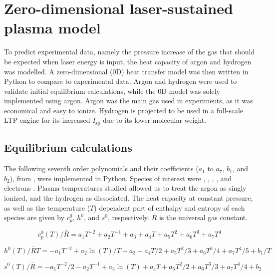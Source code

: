 \chapter{Zero-dimensional laser-sustained plasma model} \label{chp:models}

    To predict experimental data, namely the pressure increase of the gas that should be expected when laser energy is input, the heat capacity of argon and hydrogen was modelled. A zero-dimensional (0D) heat transfer model was then written in Python to compare to experimental data. Argon and hydrogen were used to validate initial equilibrium calculations, while the 0D model was solely implemented using argon. Argon was the main gas used in experiments, as it was economical and easy to ionize. Hydrogen is projected to be used in a full-scale LTP engine for its increased $I_\mathrm{sp}$ due to its lower molecular weight.

    \section{Equilibrium calculations} \label{sec:equilibrium calcs}
        
        The following seventh order polynomials and their coefficients ($a_1$ to $a_7$, $b_1$, and $b_2$), from \textcite{mcbrideNASAGlennCoefficients2002}, were implemented in Python. Species of interest were , , , , and electrons . Plasma temperatures studied allowed us to treat the argon as singly ionized, and the hydrogen as dissociated. The heat capacity at constant pressure, as well as the temperature ($T$) dependent part of enthalpy and entropy of each species are given by $c_p^0$, $h^0$, and $s^0$, respectively. $\bar R$ is the universal gas constant.

        \begin{equation}
            c_p^0 (T)/\bar R = a_1 T^{-2} + a_2 T^{-1} + a_3 + a_4   T + a_5 T^2 + a_6 T^3 + a_7 T^4
        \end{equation} 
        
        \begin{equation}
            h^0 (T)/\bar RT = -a_1 T^{-2} + a_2 \ln(T)/T + a_3 + a_4 T / 2 + a_5 {T^2}/3 + a_6 {T^3}/4 + a_7 {T^4}/5 + b_1/T
        \end{equation}
        
        \begin{equation}
            s^0(T)/\bar R = -a_1 T^{-2}/2 - a_2 T^{-1} + a_3\ln(T) + a_4   T + a_5 {T^2}/2 + a_6 T^3/3 + a_7 T^4/4 + b_2
        \end{equation}

